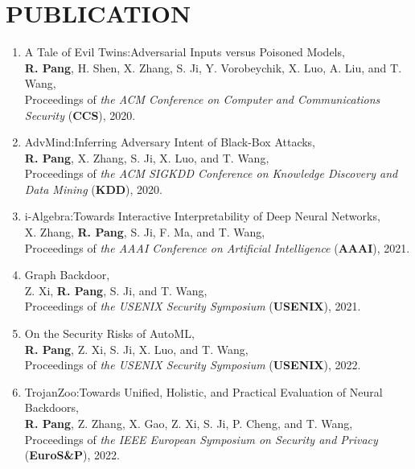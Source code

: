 \documentclass[letterpaper,11pt]{article}
\begin{document}
\section{PUBLICATION}

\begin{enumerate}[labelsep=15pt, parsep=-4pt]

    \item A Tale of Evil Twins:\@ Adversarial Inputs versus Poisoned Models,\\
    \textbf{R. Pang}, H. Shen, X. Zhang, S. Ji, Y. Vorobeychik, X. Luo, A. Liu, and T. Wang,\\
    Proceedings of {\it the ACM Conference on Computer and Communications Security\/} (\textbf{CCS}), 2020.
    
    \item AdvMind:\@ Inferring Adversary Intent of Black-Box Attacks,\\
    \textbf{R. Pang}, X. Zhang, S. Ji, X. Luo, and T. Wang,\\
    Proceedings of {\it the ACM SIGKDD Conference on Knowledge Discovery and Data Mining\/} (\textbf{KDD}), 2020.
    
    \item i-Algebra:\@ Towards Interactive Interpretability of Deep Neural Networks,\\
    X. Zhang, \textbf{R. Pang}, S. Ji, F. Ma, and T. Wang,\\
    Proceedings of {\it the AAAI Conference on Artificial Intelligence\/} (\textbf{AAAI}), 2021.
    
    \item Graph Backdoor,\\
    Z. Xi, \textbf{R. Pang}, S. Ji, and T. Wang,\\
    Proceedings of {\it the USENIX Security Symposium\/} (\textbf{USENIX}), 2021.
    
    \item On the Security Risks of AutoML,\\
    \textbf{R. Pang}, Z. Xi, S. Ji, X. Luo, and T. Wang,\\
    Proceedings of {\it the USENIX Security Symposium\/} (\textbf{USENIX}), 2022.
    
    \item TrojanZoo:\@ Towards Unified, Holistic, and Practical Evaluation of Neural Backdoors,\\
    \textbf{R. Pang}, Z. Zhang, X. Gao, Z. Xi, S. Ji, P. Cheng, and T. Wang,\\
    Proceedings of {\it the IEEE European Symposium on Security and Privacy\/} (\textbf{EuroS\&P}), 2022.
    

\end{enumerate}
\end{document}
